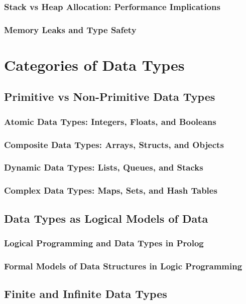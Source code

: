 \documentclass[12pt, oneside]{book}
\begin{document}
\subsubsection{Stack vs Heap Allocation: Performance Implications}
\subsubsection{Memory Leaks and Type Safety}

\section{Categories of Data Types}
\subsection{Primitive vs Non-Primitive Data Types}
\subsubsection{Atomic Data Types: Integers, Floats, and Booleans}
\subsubsection{Composite Data Types: Arrays, Structs, and Objects}
\subsubsection{Dynamic Data Types: Lists, Queues, and Stacks}
\subsubsection{Complex Data Types: Maps, Sets, and Hash Tables}
\subsection{Data Types as Logical Models of Data}
\subsubsection{Logical Programming and Data Types in Prolog}
\subsubsection{Formal Models of Data Structures in Logic Programming}
\subsection{Finite and Infinite Data Types}
\end{document}
